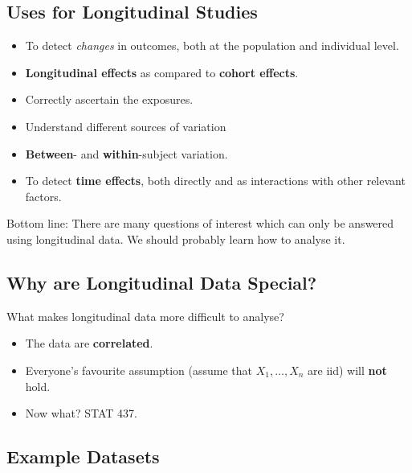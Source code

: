 \subsection{Uses for Longitudinal Studies}
\begin{itemize}
    \item To detect \emph{changes} in outcomes, both at the population and individual level.
    \item \textbf{Longitudinal effects} as compared to \textbf{cohort effects}.
    \item Correctly ascertain the exposures.
    \item Understand different sources of variation
    \item \textbf{Between}- and \textbf{within}-subject variation.
    \item To detect \textbf{time effects}, both directly and as interactions with other relevant
          factors.
\end{itemize}
Bottom line: There are many questions of interest which can only be answered using
longitudinal data. We should probably learn how to analyse it.
\subsection{Why are Longitudinal Data Special?}
What makes longitudinal data more difficult to analyse?
\begin{itemize}
    \item The data are \textbf{correlated}.
    \item Everyone's favourite assumption
          (assume that $ X_1,\ldots,X_n $ are iid) will \textbf{not} hold.
    \item Now what? STAT 437.
\end{itemize}
\subsection{Example Datasets}
